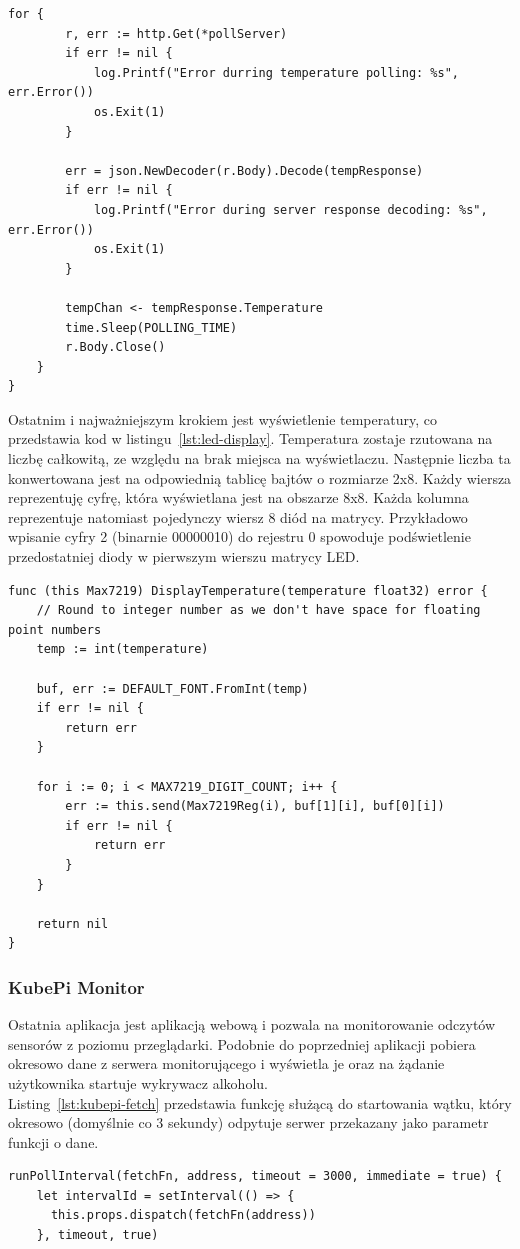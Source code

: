 \documentclass[12pt]{report}
\let\Oldsubsubsection\subsubsection
\renewcommand{\subsubsection}{\FloatBarrier\Oldsubsubsection}
\begin{document}
{\begin{lstlisting}[language=golang,caption=Odczyt temperatury z serwera,label=lst:led-temp-read]
	for {
		r, err := http.Get(*pollServer)
		if err != nil {
			log.Printf("Error durring temperature polling: %s", err.Error())
			os.Exit(1)
		}

		err = json.NewDecoder(r.Body).Decode(tempResponse)
		if err != nil {
			log.Printf("Error during server response decoding: %s", err.Error())
			os.Exit(1)
		}

		tempChan <- tempResponse.Temperature
		time.Sleep(POLLING_TIME)
		r.Body.Close()
	}
}
\end{lstlisting}

\newpage
\noindent Ostatnim i najważniejszym krokiem jest wyświetlenie temperatury, co przedstawia kod w listingu~\ref{lst:led-display}. Temperatura zostaje rzutowana na liczbę całkowitą, ze względu na brak miejsca na wyświetlaczu. Następnie liczba ta konwertowana jest na odpowiednią tablicę bajtów o rozmiarze 2x8. Każdy wiersza reprezentuję cyfrę, która wyświetlana jest na obszarze 8x8. Każda kolumna reprezentuje natomiast pojedynczy wiersz 8 diód na matrycy. Przykładowo wpisanie cyfry 2 (binarnie 00000010) do rejestru 0 spowoduje podświetlenie przedostatniej diody w pierwszym wierszu matrycy LED.
\begin{lstlisting}[language=golang,caption=Wyświetlanie temperatury,label=lst:led-display]
func (this Max7219) DisplayTemperature(temperature float32) error {
	// Round to integer number as we don't have space for floating point numbers
	temp := int(temperature)

	buf, err := DEFAULT_FONT.FromInt(temp)
	if err != nil {
		return err
	}

	for i := 0; i < MAX7219_DIGIT_COUNT; i++ {
		err := this.send(Max7219Reg(i), buf[1][i], buf[0][i])
		if err != nil {
			return err
		}
	}

	return nil
}
\end{lstlisting}

\newpage
\subsubsection{KubePi Monitor} \label{subsect:kubepi-monitor}
Ostatnia aplikacja jest aplikacją webową i pozwala na monitorowanie odczytów sensorów z poziomu przeglądarki. Podobnie do poprzedniej aplikacji pobiera okresowo dane z serwera monitorującego i wyświetla je oraz na żądanie użytkownika startuje wykrywacz alkoholu. \\

\noindent Listing~\ref{lst:kubepi-fetch} przedstawia funkcję służącą do startowania wątku, który okresowo (domyślnie co 3 sekundy) odpytuje serwer przekazany jako parametr funkcji o dane.
\begin{lstlisting}[language=golang,caption=Startowanie wątków do odczytu danych,label=lst:kubepi-fetch]
  runPollInterval(fetchFn, address, timeout = 3000, immediate = true) {
    let intervalId = setInterval(() => {
      this.props.dispatch(fetchFn(address))
    }, timeout, true)


\end{lstlisting}}
\end{document}
